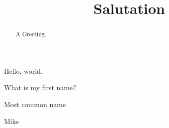 \documentclass{ximera}
\title[Salutation]{Salutation}
\begin{document}
\begin{abstract}
A Greeting.
\end{abstract}
\maketitle
Hello, world.

\begin{question}
What is my first name?
\begin{hint}
Most common name
\end{hint}
\begin{freeResponse}
Mike
\end{freeResponse}
\end{question}
\end{document}
